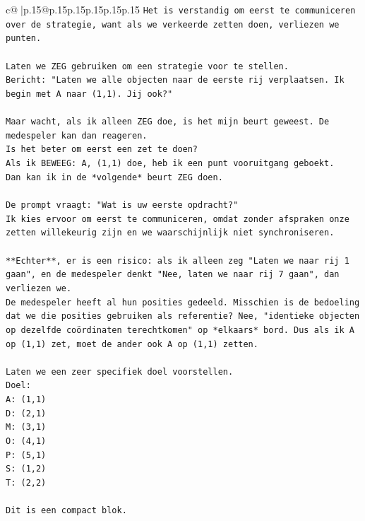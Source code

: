 \documentclass{article}
\begin{document}
{\begin{supertabular}{c@{$\;$}|p{.15\linewidth}@{}p{.15\linewidth}p{.15\linewidth}p{.15\linewidth}p{.15\linewidth}p{.15\linewidth}}
{{{\texttt{Het is verstandig om eerst te communiceren over de strategie, want als we verkeerde zetten doen, verliezen we punten.} \\
\\ 
\texttt{Laten we ZEG gebruiken om een strategie voor te stellen.} \\
\texttt{Bericht: "Laten we alle objecten naar de eerste rij verplaatsen. Ik begin met A naar (1,1). Jij ook?"} \\
\\ 
\texttt{Maar wacht, als ik alleen ZEG doe, is het mijn beurt geweest. De medespeler kan dan reageren.} \\
\texttt{Is het beter om eerst een zet te doen?} \\
\texttt{Als ik BEWEEG: A, (1,1) doe, heb ik een punt vooruitgang geboekt.} \\
\texttt{Dan kan ik in de *volgende* beurt ZEG doen.} \\
\\ 
\texttt{De prompt vraagt: "Wat is uw eerste opdracht?"} \\
\texttt{Ik kies ervoor om eerst te communiceren, omdat zonder afspraken onze zetten willekeurig zijn en we waarschijnlijk niet synchroniseren.} \\
\\ 
\texttt{**Echter**, er is een risico: als ik alleen zeg "Laten we naar rij 1 gaan", en de medespeler denkt "Nee, laten we naar rij 7 gaan", dan verliezen we.} \\
\texttt{De medespeler heeft al hun posities gedeeld. Misschien is de bedoeling dat we die posities gebruiken als referentie? Nee, "identieke objecten op dezelfde coördinaten terechtkomen" op *elkaars* bord. Dus als ik A op (1,1) zet, moet de ander ook A op (1,1) zetten.} \\
\\ 
\texttt{Laten we een zeer specifiek doel voorstellen.} \\
\texttt{Doel:} \\
\texttt{A: (1,1)} \\
\texttt{D: (2,1)} \\
\texttt{M: (3,1)} \\
\texttt{O: (4,1)} \\
\texttt{P: (5,1)} \\
\texttt{S: (1,2)} \\
\texttt{T: (2,2)} \\
\\ 
\texttt{Dit is een compact blok.} \\
}}}
\end{supertabular}}
\end{document}
